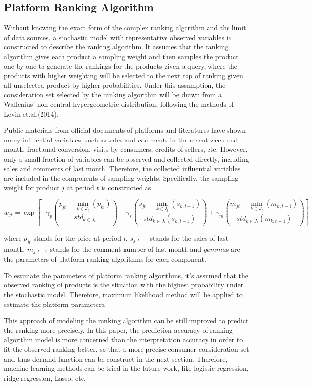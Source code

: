 \documentclass{article}
\begin{document}
\subsection{Platform Ranking Algorithm}
Without knowing the exact form of the complex ranking algorithm and the limit of data sources, a stochastic model with representative observed variables is constructed to describe the ranking algorithm. It assumes that the ranking algorithm gives each product a sampling weight and then samples the product one by one to generate the rankings for the products given a query, where the products with higher weighting will be selected to the next top of ranking given all unselected product by higher probabilities. Under this assumption, the consideration set selected by the ranking algorithm will be drawn from a Wallenius' non-central hypergeometric distribution, following the methods of Levin et.al.(2014).  

Public materials from official documents of platforms and literatures have shown many influential variables, such as sales and comments in the recent week and month, fractional conversion, visits by consumers, credits of sellers, etc. However, only a small fraction of variables can be observed and collected directly, including sales and comments of last month. Therefore, the collected influential variables are included in the components of sampling weights. Specifically, the sampling weight for product $j$ at period $t$ is constructed as 

$$
w_{jt}  = \exp[-\gamma_p (\frac{p_{jt}-\min_{k \in J_t}(p_{kt})}{std_{k \in J_t}})
+ \gamma_s (\frac{s_{jt}-\min_{k \in J_t}(s_{k,t-1})}{std_{k \in J_t}(s_{k,t-1})}) 
+ \gamma_m (\frac{m_{jt}-\min_{k \in J_t}(m_{k,t-1})}{std_{k \in J_t}(m_{k,t-1})}) 
]
$$

where $p_{jt}$ stands for the price at period $t$, $s_{j,t-1}$ stands for the sales of last month, $m_{j,t-1}$ stands for the comment number of last month and $gamma$s are the parameters of platform ranking algorithms for each component. 

To estimate the parameters of platform ranking algorithms, it's assumed that the observed ranking of products is the situation with the highest probability under the stochastic model. Therefore, maximum likelihood method will be applied to estimate the platform parameters.

This approach of modeling the ranking algorithm can be still improved to predict the ranking more precisely. In this paper, the prediction accuracy of ranking algorithm model is more concerned than the interpretation accuracy in order to fit the observed ranking better, so that a more precise consumer consideration set and thus demand function can be construct in the next section. Therefore, machine learning methods can be tried in the future work, like logistic regression, ridge regression, Lasso, etc.  
\end{document}
